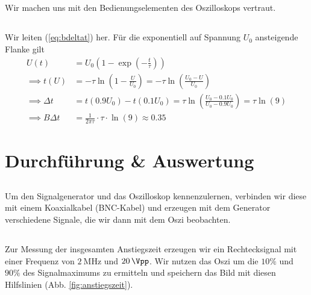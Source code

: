 \documentclass{article}
\newcommand{\subsectionalph}{ \renewcommand{\thesubsection}{\arabic{section}.\alph{subsection}} }
\begin{document}
\subsection{}
Wir machen uns mit den Bedienungselementen des Oszilloskops vertraut.

\subsection{}
Wir leiten (\ref{eq:bdeltat}) her. Für die exponentiell auf Spannung $U_0$ ansteigende Flanke gilt
\begin{align*}
  U(t) &= U_0 \left(1 - \exp(-\frac{t}{\tau})\right) \\
  \implies t(U) &= -\tau \ln\left(1 - \frac{U}{U_0}\right) = -\tau \ln\left(\frac{U_0-U}{U_0}\right) \\
  \implies \Delta t &= t(0.9 U_0) - t(0.1 U_0) = \tau \ln\left(\frac{U_0-0.1U_0}{U_0-0.9U_0}\right) = \tau \ln(9) \\
  \implies B \Delta t &= \frac{1}{2\pi\tau} \cdot \tau \cdot \ln(9) \approx 0.35
\end{align*}

\endgroup

\section{Durchführung \& Auswertung}
\begingroup
\subsectionalph

\subsection{}
Um den Signalgenerator und das Oszilloskop kennenzulernen, verbinden wir diese mit einem Koaxialkabel (BNC-Kabel)
und erzeugen mit dem Generator verschiedene Signale, die wir dann mit dem Oszi beobachten.

\subsection{}
Zur Messung der insgesamten Anstiegszeit erzeugen wir ein Rechtecksignal mit einer Frequenz von $\SI{2}{\mega\hertz}$ und $\SI{20}{\Vpp}$. Wir nutzen das Oszi um die $10\%$ und $90\%$ des Signalmaximums zu ermitteln und speichern das Bild mit diesen Hilfslinien (Abb. \ref{fig:anstiegszeit}).
\end{document}
